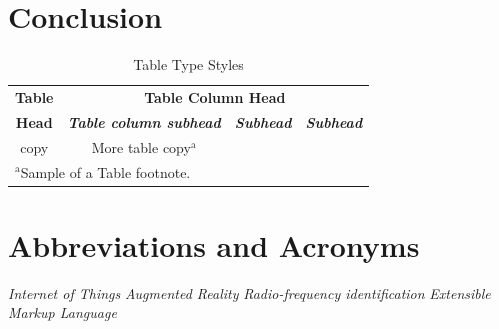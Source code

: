 \documentclass[conference]{IEEEtran}
\begin{document}
\section{Conclusion}\label{Conclusion}


\begin{table}[htbp]
\caption{Table Type Styles}
\begin{center}
\begin{tabular}{|c|c|c|c|}
\hline
\textbf{Table}&\multicolumn{3}{|c|}{\textbf{Table Column Head}} \\
\cline{2-4} 
\textbf{Head} & \textbf{\textit{Table column subhead}}& \textbf{\textit{Subhead}}& \textbf{\textit{Subhead}} \\
\hline
copy& More table copy$^{\mathrm{a}}$& &  \\
\hline
\multicolumn{4}{l}{$^{\mathrm{a}}$Sample of a Table footnote.}
\end{tabular}
\label{tab1}
\end{center}
\end{table}

\section*{Abbreviations and Acronyms}
\begin{acronym}[Bash]
 {\textit{Internet of Things}}
 {\textit{Augmented Reality}}
 {\textit{Radio-frequency identification}}
 {\textit{Extensible Markup Language}}
\end{acronym}


{\footnotesize
}
\end{document}
